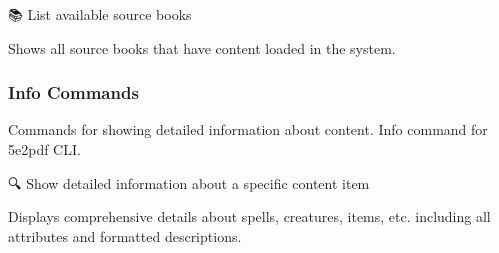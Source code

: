 \documentclass[letterpaper,10pt,english]{sphinxmanual}
\begin{document}

\begin{fulllineitems}
\label{\detokenize{api/cli:src.cli.commands.list_content.list_sources}}
\pysigstartsignatures
\pysiglinewithargsret
{}
{}
{}
\pysigstopsignatures
\sphinxAtStartPar
📚 List available source books

\sphinxAtStartPar
Shows all source books that have content loaded in the system.

\end{fulllineitems}



\subsubsection{Info Commands}
\label{\detokenize{api/cli:info-commands}}
\sphinxAtStartPar
Commands for showing detailed information about content.
\label{\detokenize{api/cli:module-src.cli.commands.info}}
\sphinxAtStartPar
Info command for 5e2pdf CLI.

\begin{fulllineitems}
\label{\detokenize{api/cli:src.cli.commands.info.show_content_info}}
\pysigstartsignatures
\pysiglinewithargsret
{}
{\sphinxparamcomma {}\sphinxparamcomma {}}
{}
\pysigstopsignatures
\sphinxAtStartPar
🔍 Show detailed information about a specific content item

\sphinxAtStartPar
Displays comprehensive details about spells, creatures, items, etc.
including all attributes and formatted descriptions.

\end{fulllineitems}
\end{document}
